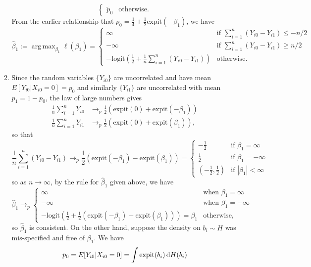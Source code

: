 \documentclass[11pt]{article}
\DeclareMathOperator*{\argmax}{arg\,max}
\begin{document}
\begin{enumerate}
\begin{enumerate}
\[\begin{cases}
					\widetilde{p}_0 & \text{otherwise.}
				\end{cases}
			\]
			From the earlier relationship that $p_0 = \frac{1}{4} + \frac{1}{2}\mathrm{expit}(-\beta_1)$, we have
			\[
				\widehat{\beta}_1:=\argmax_{\beta_1} \ell(\beta_1) = \begin{cases}
					\infty & \text{if } \sum_{i=1}^n (Y_{i0}-Y_{i1}) \leq -n/2 \\
					-\infty & \text{if } \sum_{i=1}^n (Y_{i0}-Y_{i1}) \geq n/2 \\
					-\mathrm{logit}(\frac{1}{2} + \frac{1}{n} \sum_{i=1}^n(Y_{i0}-Y_{i1})) & \text{otherwise.}
				\end{cases}
			\]
			\item Since the random variables $\{Y_{i0}\}$ are uncorrelated and have mean $E[Y_{i0}|X_{i0}=0] = p_0$ and similarly $\{Y_{i1}\}$ are uncorrelated with mean $p_1 = 1-p_0$, the law of large numbers gives
			\begin{align*}
				\frac{1}{n}\sum_{i=1}^n Y_{i0} &\to_p \frac{1}{2}(\mathrm{expit}(0) + \mathrm{expit}(-\beta_1)) \\
				\frac{1}{n}\sum_{i=1}^n Y_{i1} &\to_p \frac{1}{2}(\mathrm{expit}(0) + \mathrm{expit}(\beta_1)),
			\end{align*}
			so that
			\[
				\frac{1}{n}\sum_{i=1}^n (Y_{i0}-Y_{i1}) \to_p \frac{1}{2}(\mathrm{expit}(-\beta_1) - \mathrm{expit}(\beta_1)) = \begin{cases}
					-\frac{1}{2} & \text{if } \beta_1 = \infty \\
					\frac{1}{2} & \text{if } \beta_1 = -\infty \\
					(-\frac{1}{2}, \frac{1}{2}) & \text{if } |\beta_1| < \infty
				\end{cases}
			\]
			so as $n\to \infty$, by the rule for $\widehat{\beta}_1$ given above, we have
			\[
				\widehat{\beta}_1 \to_p \begin{cases}
					\infty & \text{when } \beta_1 = \infty \\
					-\infty & \text{when } \beta_1 = -\infty \\
					-\mathrm{logit}(\frac{1}{2} + \frac{1}{2}(\mathrm{expit}(-\beta_1) - \mathrm{expit}(\beta_1))) = \beta_1 & \text{otherwise},
				\end{cases}
			\]
			so $\widehat{\beta}_1$ is consistent. On the other hand, suppose the density on $b_i\sim H$ was mis-specified and free of $\beta_1$. We have
		\begin{align*}
			p_0 &= E[Y_{i0}|X_{i0}=0] = \int \mathrm{expit}(b_i)\dif H(b_i) \\

\end{align*}
\end{enumerate}
\end{enumerate}
\end{document}
